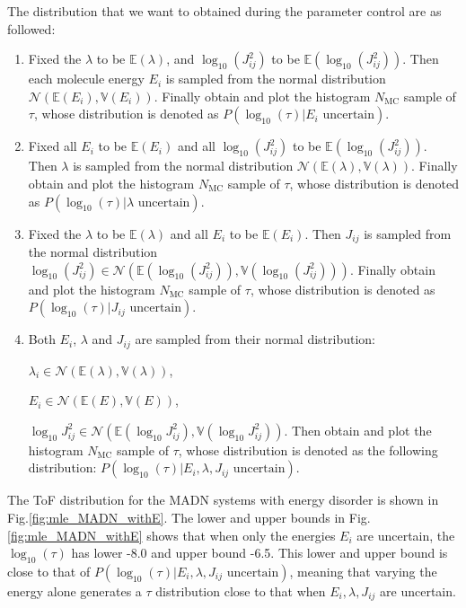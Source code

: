 \documentclass[%
 reprint,
 amsmath,amssymb,
 aps,
]{revtex4-2}
\begin{document}
The distribution that we want to obtained during the parameter control are as followed:
\begin{enumerate}
    \item Fixed the $\lambda$ to be $\mathbb{E}(\lambda)$, and $\log_{10}(J_{ij}^2)$ to be $\mathbb{E}(\log_{10}(J_{ij}^2))$. Then each molecule energy $E_i$ is sampled from the normal distribution $\mathcal{N}(\mathbb{E}(E_i), \mathbb{V}(E_i))$. Finally obtain and plot the histogram $N_\text{MC}$ sample of $\tau$, whose distribution is denoted as $P(\log_{10}(\tau)|E_i \text{ uncertain})$.
    \item Fixed all $E_i$ to be $\mathbb{E}(E_i)$ and all $\log_{10}(J_{ij}^2)$ to be $\mathbb{E}(\log_{10}(J_{ij}^2))$. Then $\lambda$ is sampled from the normal distribution $\mathcal{N}(\mathbb{E}(\lambda), \mathbb{V}(\lambda))$. Finally obtain and plot the histogram  $N_\text{MC}$ sample of $\tau$, whose distribution is denoted as $P(\log_{10}(\tau)|\lambda \text{ uncertain})$. 
    \item Fixed the $\lambda$ to be $\mathbb{E}(\lambda)$ and all $E_i$ to be $\mathbb{E}(E_i)$.     Then $J_{ij}$ is sampled from the normal distribution $\log_{10}(J_{ij}^2) \in \mathcal{N}(\mathbb{E}(\log_{10}(J_{ij}^2)), \mathbb{V}(\log_{10}(J_{ij}^2)))$. Finally obtain and plot the histogram  $N_\text{MC}$ sample of $\tau$, whose distribution is denoted as $P(\log_{10}(\tau)|J_{ij} \text{ uncertain})$.
    \item Both $E_i$, $\lambda$ and $J_{ij}$ are sampled from their normal distribution:
    
    $\lambda_i \in \mathcal{N}(\mathbb{E}(\lambda), \mathbb{V}(\lambda))$, 
    
    $E_i \in \mathcal{N}(\mathbb{E}(E), \mathbb{V}(E))$, 
    
    $\log_{10}J_{ij}^2 \in \mathcal{N}(\mathbb{E}(\log_{10}J_{ij}^2), \mathbb{V}(\log_{10}J_{ij}^2))$.
    Then obtain and plot the histogram $N_\text{MC}$ sample of $\tau$, whose distribution is denoted as the following distribution: 
    $P(\log_{10}(\tau)|E_i, \lambda, J_{ij} \text{ uncertain})$.
\end{enumerate}

The ToF distribution for the MADN systems with energy disorder is shown in Fig.\ref{fig:mle_MADN_withE}.
The lower and upper bounds in Fig. \ref{fig:mle_MADN_withE} shows that when only the energies $E_i$ are uncertain, the $\log_{10}(\tau)$ has lower -8.0 and upper bound -6.5. This lower and upper bound is close to that of $P(\log_{10}(\tau)|E_i, \lambda, J_{ij} \text{ uncertain})$, meaning that varying the energy alone generates a $\tau$ distribution close to that when $E_i, \lambda, J_{ij}$ are uncertain. 
\end{document}
